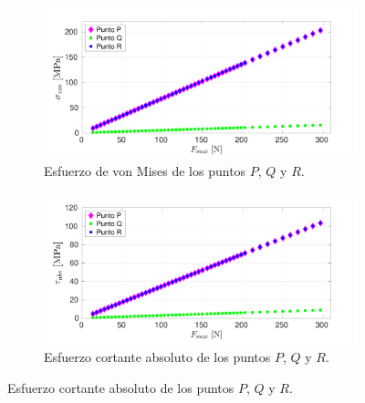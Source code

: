 \begin{figure}[H]
\centering
	\begin{subfigure}{1\linewidth}
		\centering
		\includegraphics[width=\linewidth, trim={1cm 0cm 2cm 0cm},clip]{Imagenes/esf_vm.pdf}
		\caption{Esfuerzo de von Mises de los puntos $P$, $Q$ y $R$.}
		\label{fig:esf_vm201}
	\end{subfigure}
	\begin{subfigure}{1\linewidth}
		\centering
		\includegraphics[width=\linewidth, trim={1cm 0cm 2cm 0cm},clip]{Imagenes/esf_ms.pdf}
		\caption{Esfuerzo cortante absoluto de los puntos $P$, $Q$ y $R$.}
		\label{fig:esf_ms201}
	\end{subfigure}
\end{figure}

